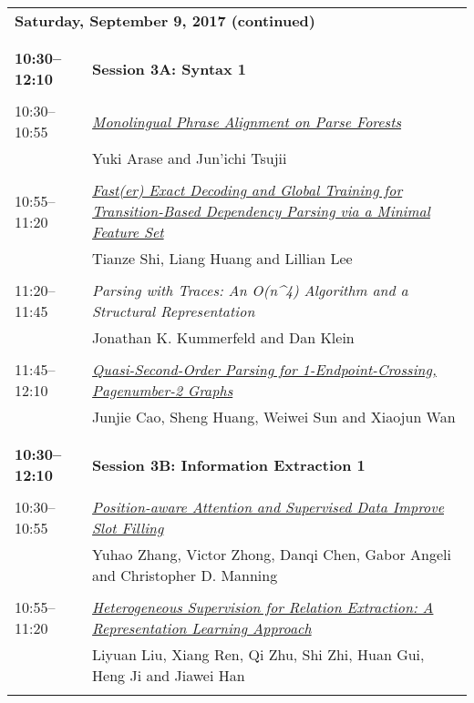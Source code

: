 \begin{tabular}{p{20mm}p{128mm}}
\\
\multicolumn{2}{l}{\bf Saturday, September 9, 2017 (continued)} \\\\
\\{\bf 10:30--12:10} & {\bf Session 3A: Syntax 1 } \\
\\
10:30--10:55 & \hyperlink{page.1}{\em Monolingual Phrase Alignment on Parse Forests}\\
         & Yuki Arase and Jun'ichi Tsujii \\
\\

10:55--11:20 & \hyperlink{page.12}{\em Fast(er) Exact Decoding and Global Training for Transition-Based Dependency Parsing via a Minimal Feature Set}\\
         & Tianze Shi, Liang Huang and Lillian Lee \\
\\

11:20--11:45 & {\em Parsing with Traces: An O(n\^{}4) Algorithm and a Structural Representation}\\
         & Jonathan K. Kummerfeld and Dan Klein \\
\\

11:45--12:10 & \hyperlink{page.24}{\em Quasi-Second-Order Parsing for 1-Endpoint-Crossing, Pagenumber-2 Graphs}\\
         & Junjie Cao, Sheng Huang, Weiwei Sun and Xiaojun Wan \\
\\

\\{\bf 10:30--12:10} & {\bf Session 3B: Information Extraction 1 } \\
\\
10:30--10:55 & \hyperlink{page.35}{\em Position-aware Attention and Supervised Data Improve Slot Filling}\\
         & Yuhao Zhang, Victor Zhong, Danqi Chen, Gabor Angeli and Christopher D. Manning \\
\\

10:55--11:20 & \hyperlink{page.46}{\em Heterogeneous Supervision for Relation Extraction: A Representation Learning Approach}\\
         & Liyuan Liu, Xiang Ren, Qi Zhu, Shi Zhi, Huan Gui, Heng Ji and Jiawei Han \\
\\


\end{tabular}
